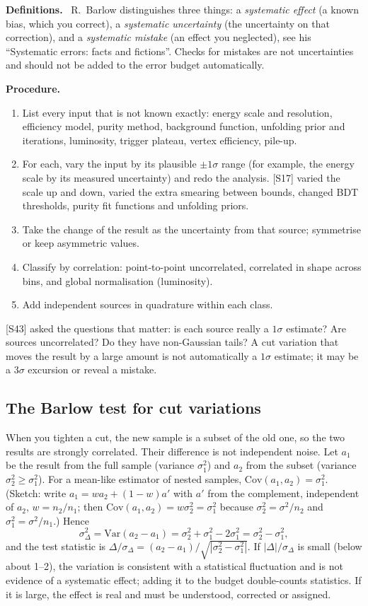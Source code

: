 \documentclass[11pt,letterpaper]{article}
\newcommand{\hd}[1]{\par\smallskip\noindent\textbf{\color{blue!50!black}#1.}\ }
\begin{document}
\hd{Definitions} R.\ Barlow distinguishes three things: a \emph{systematic effect} (a known bias, which you correct), a
\emph{systematic uncertainty} (the uncertainty on that correction), and a \emph{systematic mistake} (an effect you neglected), see
his ``Systematic errors: facts and fictions''. Checks for mistakes are not uncertainties and should not be added to the error budget
automatically.

\hd{Procedure}
\begin{enumerate}
\item List every input that is not known exactly: energy scale and resolution, efficiency model, purity method, background function,
unfolding prior and iterations, luminosity, trigger plateau, vertex efficiency, pile-up.
\item For each, vary the input by its plausible $\pm1\sigma$ range (for example, the energy scale by its measured uncertainty) and
redo the analysis. [S17] varied the scale up and down, varied the extra smearing between bounds, changed BDT thresholds, purity fit
functions and unfolding priors.
\item Take the change of the result as the uncertainty from that source; symmetrise or keep asymmetric values.
\item Classify by correlation: point-to-point uncorrelated, correlated in shape across bins, and global normalisation (luminosity).
\item Add independent sources in quadrature within each class.
\end{enumerate}
[S43] asked the questions that matter: is each source really a $1\sigma$ estimate? Are sources uncorrelated? Do they have
non-Gaussian tails? A cut variation that moves the result by a large amount is not automatically a $1\sigma$ estimate; it may be a
$3\sigma$ excursion or reveal a mistake.

\subsection{The Barlow test for cut variations}
When you tighten a cut, the new sample is a subset of the old one, so the two results are strongly correlated. Their difference is not
independent noise. Let $a_1$ be the result from the full sample (variance $\sigma_1^2$) and $a_2$ from the subset (variance
$\sigma_2^2\ge\sigma_1^2$). For a mean-like estimator of nested samples, $\mathrm{Cov}(a_1,a_2)=\sigma_1^2$. (Sketch: write $a_1=wa_2+(1-w)a'$
with $a'$ from the complement, independent of $a_2$, $w=n_2/n_1$; then $\mathrm{Cov}(a_1,a_2)=w\sigma_2^2=\sigma_1^2$ because
$\sigma_2^2=\sigma^2/n_2$ and $\sigma_1^2=\sigma^2/n_1$.) Hence
\begin{equation}
\sigma_\Delta^2=\mathrm{Var}(a_2-a_1)=\sigma_2^2+\sigma_1^2-2\sigma_1^2=\sigma_2^2-\sigma_1^2 ,
\end{equation}
and the test statistic is $\Delta/\sigma_\Delta=(a_2-a_1)/\sqrt{|\sigma_2^2-\sigma_1^2|}$. If $|\Delta|/\sigma_\Delta$ is small
(below about 1--2), the variation is consistent with a statistical fluctuation and is not evidence of a systematic effect; adding it to
the budget double-counts statistics. If it is large, the effect is real and must be understood, corrected or assigned.
\end{document}
